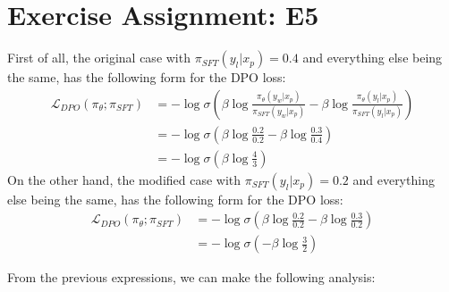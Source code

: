 \documentclass{article}
\begin{document}
\section{Exercise Assignment: E5}\label{sec:e5}
First of all, the original case with $\pi_{SFT}(y_l|x_p) = 0.4$ and everything else being the same, has the following form for the DPO loss:
\begin{align*}
    \mathcal{L}_{DPO}(\pi_\theta; \pi_{SFT}) & = -\log \sigma\left(\beta\log\frac{\pi_\theta(y_w|x_p)}{\pi_{SFT}(y_w|x_p)} - \beta\log\frac{\pi_\theta(y_l|x_p)}{\pi_{SFT}(y_l|x_p)}\right) \\
                                             & = -\log \sigma\left(\beta\log\frac{0.2}{0.2} - \beta\log\frac{0.3}{0.4}\right)                                                               \\
                                             & = -\log \sigma\left(\beta\log\frac{4}{3}\right)
\end{align*}
On the other hand, the modified case with $\pi_{SFT}(y_l|x_p) = 0.2$ and everything else being the same, has the following form for the DPO loss:
\begin{align*}
    \mathcal{L}_{DPO}(\pi_\theta; \pi_{SFT}) & = -\log \sigma\left(\beta\log\frac{0.2}{0.2} - \beta\log\frac{0.3}{0.2}\right) \\
                                             & = -\log \sigma\left(-\beta\log\frac{3}{2}\right)
\end{align*}

\clearpage

From the previous expressions, we can make the following analysis:
\end{document}
